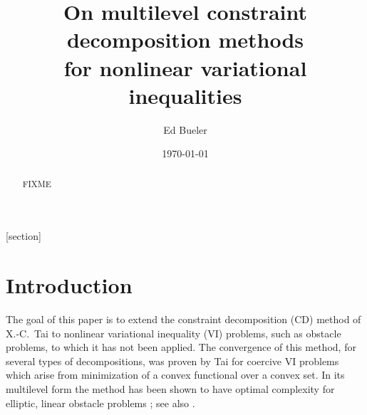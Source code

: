 \documentclass[letterpaper,final,12pt,reqno]{amsart}
\theoremstyle{cstyle}
\theoremstyle{cstyle*}
\theoremstyle{dstyle}
\numberwithin{equation}{section}
\numberwithin{figure}{section}
\numberwithin{table}{section}
\numberwithin{theorem}{section}
\begin{document}
\title[On multilevel constraint decomposition methods]{On multilevel constraint decomposition methods \\ for nonlinear variational inequalities}

\author{Ed Bueler}

\date{\today}

\begin{abstract} FIXME
\end{abstract}

\maketitle


\thispagestyle{empty}

[section]


\section{Introduction} \label{sec:intro}

The goal of this paper is to extend the constraint decomposition (CD) method of X.-C.~Tai \cite{Tai2003} to nonlinear variational inequality (VI) problems, such as obstacle problems, to which it has not been applied.  The convergence of this method, for several types of decompositions, was proven by Tai for coercive VI problems which arise from minimization of a convex functional over a convex set.  In its multilevel form the method has been shown to have optimal complexity for elliptic, linear obstacle problems \cite[Subsection 5.4]{Tai2003}; see also \cite[Theorem 4.6 and Algorithm 4.7]{GraeserKornhuber2009}.
\end{document}
